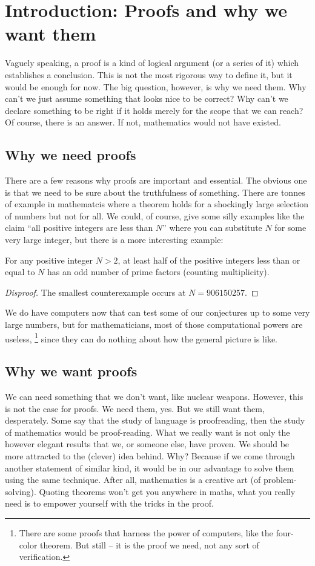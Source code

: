\section{Introduction: Proofs and why we want them}
Vaguely speaking, a proof is a kind of logical argument (or a series of it) which establishes a conclusion.
This is not the most rigorous way to define it, but it would be enough for now.
The big question, however, is why we need them.
Why can't we just assume something that looks nice to be correct?
Why can't we declare something to be right if it holds merely for the scope that we can reach?
Of course, there is an answer.
If not, mathematics would not have existed.
\subsection{Why we need proofs}
There are a few reasons why proofs are important and essential.
The obvious one is that we need to be sure about the truthfulness of something.
There are tonnes of example in mathematcis where a theorem holds for a shockingly large selection of numbers but not for all.
We could, of course, give some silly examples like the claim ``all positive integers are less than $N$'' where you can substitute $N$ for some very large integer, but there is a more interesting example:
\begin{example}
    For any positive integer $N>2$, at least half of the positive integers less than or equal to $N$ has an odd number of prime factors (counting multiplicity).
\end{example}
\begin{proof}[Disproof]
    The smallest counterexample occurs at $N=906150257$.
\end{proof}
We do have computers now that can test some of our conjectures up to some very large numbers, but for mathematicians, most of those computational powers are useless,
\footnote{There are some proofs that harness the power of computers, like the four-color theorem. But still -- it is the proof we need, not any sort of verification.}
since they can do nothing about how the general picture is like.
\subsection{Why we want proofs}
We can need something that we don't want, like nuclear weapons.
However, this is not the case for proofs.
We need them, yes.
But we still want them, desperately.
Some say that the study of language is proofreading, then the study of mathematics would be proof-reading.
What we really want is not only the however elegant results that we, or someone else, have proven.
We should be more attracted to the (clever) idea behind.
Why? Because if we come through another statement of similar kind, it would be in our advantage to solve them using the same technique.
After all, mathematics is a creative art (of problem-solving).
Quoting theorems won't get you anywhere in maths, what you really need is to empower yourself with the tricks in the proof.
